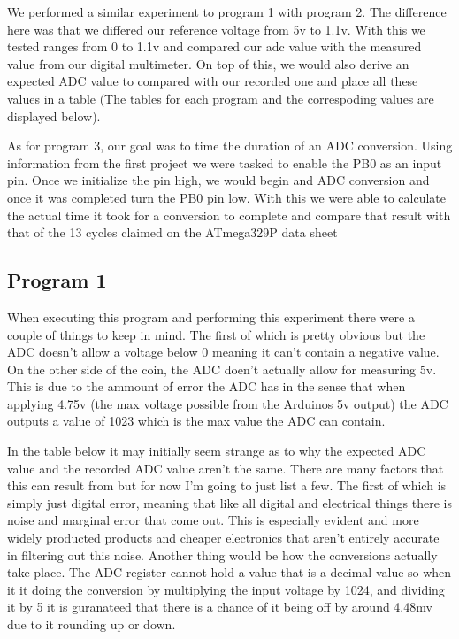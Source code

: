 \documentclass[11pt,pdftex,portrait,letterpaper]{article}
\begin{document}
	We performed a similar experiment to program 1 with program 2. The difference here was that we differed our reference voltage from 5v to 1.1v. With this we tested ranges from 0 to 1.1v and compared our adc value with the measured value from our digital multimeter. On top of this, we would also derive an expected ADC value to compared with our recorded one and place all these values in a table (The tables for each program and the correspoding values are displayed below).
	
	As for program 3, our goal was to time the duration of an ADC conversion. Using information from the first project we were tasked to enable the PB0 as an input pin. Once we initialize the pin high, we would begin and ADC conversion and once it was completed turn the PB0 pin low. With this we were able to calculate the actual time it took for a conversion to complete and compare that result with that of the 13 cycles claimed on the ATmega329P data sheet	
	\subsection{Program 1}
	 
	When executing this program and performing this experiment there were a couple of things to keep in mind. The first of which is pretty obvious but the ADC doesn't allow a voltage below 0 meaning it can't contain a negative value. On the other side of the coin, the ADC doen't actually allow for measuring 5v. This is due to the ammount of error the ADC has in the sense that when applying 4.75v (the max voltage possible from the Arduinos 5v output) the ADC outputs a value of 1023 which is the max value the ADC can contain. 
	
	In the table below it may initially seem strange as to why the expected ADC value and the recorded ADC value aren't the same. There are many factors that this can result from but for now I'm going to just list a few. The first of which is simply just digital error, meaning that like all digital and electrical things there is noise and marginal error that come out. This is especially evident and more widely producted products and cheaper electronics that aren't entirely accurate in filtering out this noise. Another thing would be how the conversions actually take place. The ADC register cannot hold a value that is a decimal value so when it it doing the conversion by multiplying the input voltage by 1024, and dividing it by 5 it is guranateed that there is a chance of it being off by around 4.48mv due to it rounding up or down.
	
\end{document}

